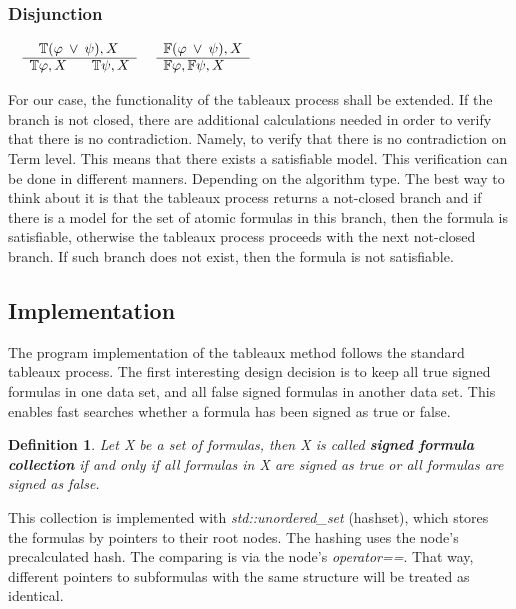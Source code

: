 \documentclass{article}
\newtheorem{defn}{Definition}[section]
\newcommand{\signT}{\mathbb{T}}
\newcommand{\signF}{\mathbb{F}}
\begin{document}
		\subsubsection*{Disjunction}
			$\begin{array}{rl}
				& \:\:\: \signT(\varphi \: \vee \: \psi), X \\
			      \cline{2-2}
			      & \signT\varphi, X \:\:\:\:\:\:\:\: \signT\psi, X
			\end{array}$
			\:\:\:\:\:\:\:\:\:\:\:\:\:\:\:\:\:\:\:\:\:\:\:\:\:\:\:\:\:\:\:\:
			$\begin{array}{rl}
				& \signF(\varphi \: \vee \: \psi), X \\
			      \cline{2-2}
			      & \signF\varphi, \signF\psi, X
			\end{array}$

	\newpage
	For our case, the functionality of the tableaux process shall be extended. If the branch is not closed, there are additional calculations needed in order to verify that there is no contradiction. Namely, to verify that there is no contradiction on Term level. This means that there exists a satisfiable model.
	This verification can be done in different manners. Depending on the algorithm type. The best way to think about it is that the tableaux process returns a not-closed branch and if there is a model for the set of atomic formulas in this branch, then the formula is satisfiable, otherwise the tableaux process proceeds with the next not-closed branch. If such branch does not exist, then the formula is not satisfiable. 

	\subsection{Implementation}
	The program implementation of the tableaux method follows the standard tableaux process. The first interesting design decision is to keep all true signed formulas in one data set, and all false signed formulas in another data set. This enables fast searches whether a formula has been signed as true or false.

	\begin{defn}
	Let X be a set of formulas, then X is called \textbf{signed formula collection} if and only if all formulas in X are signed as true or all formulas are signed as false.
	\end{defn}

	This collection is implemented with \textit{std::unordered\_set} (hashset), which stores the formulas by pointers to their root nodes. The hashing uses the node's precalculated hash. The comparing is via the node's \textit{operator==}. That way, different pointers to subformulas with the same structure will be treated as identical.
\end{document}
